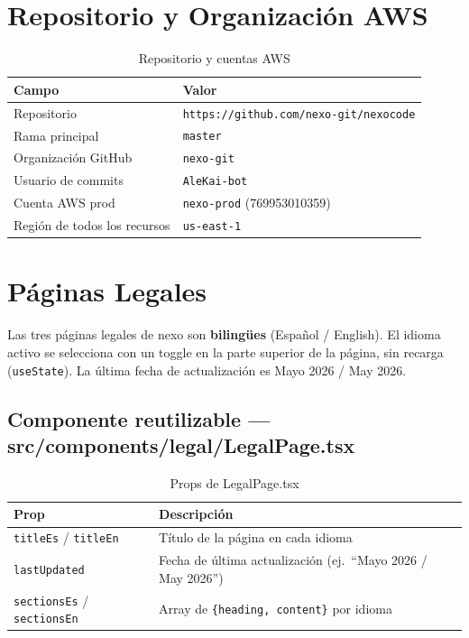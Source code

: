 \documentclass[12pt,a4paper]{article}
\begin{document}
\section{Repositorio y Organización AWS}

\begin{table}[H]
\centering
\begin{tabular}{@{}ll@{}}
\toprule
\textbf{Campo} & \textbf{Valor} \\
\midrule
Repositorio & \texttt{https://github.com/nexo-git/nexocode} \\
Rama principal & \texttt{master} \\
Organización GitHub & \texttt{nexo-git} \\
Usuario de commits & \texttt{AleKai-bot} \\
\midrule
Cuenta AWS prod & \texttt{nexo-prod} (769953010359) \\
Región de todos los recursos & \texttt{us-east-1} \\
\bottomrule
\end{tabular}
\caption{Repositorio y cuentas AWS}
\end{table}

\section{Páginas Legales}

\begin{nexobox}
Las tres páginas legales de nexo son \textbf{bilingües} (Español / English). El idioma
activo se selecciona con un toggle en la parte superior de la página, sin recarga
(\texttt{useState}). La última fecha de actualización es Mayo 2026 / May 2026.
\end{nexobox}

\subsection{Componente reutilizable --- src/components/legal/LegalPage.tsx}

\begin{table}[H]
\centering
\begin{tabular}{@{}ll@{}}
\toprule
\textbf{Prop} & \textbf{Descripción} \\
\midrule
\texttt{titleEs} / \texttt{titleEn} & Título de la página en cada idioma \\
\texttt{lastUpdated} & Fecha de última actualización (ej.\ ``Mayo 2026 / May 2026'') \\
\texttt{sectionsEs} / \texttt{sectionsEn} & Array de \texttt{\{heading, content\}} por idioma \\
\bottomrule
\end{tabular}
\caption{Props de LegalPage.tsx}
\end{table}
\end{document}

